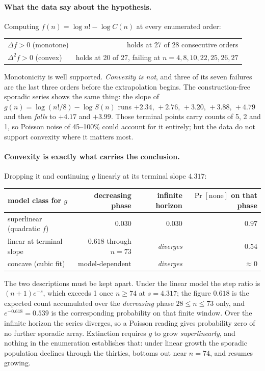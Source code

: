 \documentclass[11pt,a4paper]{article}
\theoremstyle{definition}
\begin{document}
\paragraph{What the data say about the hypothesis.} Computing
$f(n)=\log n!-\log C(n)$ at every enumerated order:

\begin{center}
\begin{tabular}{@{}lr@{}}
\toprule
$\Delta f>0$ (monotone) & holds at 27 of 28 consecutive orders \\
$\Delta^2 f>0$ (convex) & holds at 20 of 27, failing at $n=4,8,10,22,25,26,27$ \\
\bottomrule
\end{tabular}
\end{center}

Monotonicity is well supported. \emph{Convexity is not}, and three of its seven
failures are the last three orders before the extrapolation begins. The
construction-free sporadic series shows the same thing: the slope of
$g(n)=\log(n!/8)-\log S(n)$ runs $+2.34,\,+2.76,\,+3.20,\,+3.88,\,+4.79$ and then
\emph{falls} to $+4.17$ and $+3.99$. Those terminal points carry counts of 5, 2
and 1, so Poisson noise of 45--100\% could account for it entirely; but the data
do not support convexity where it matters most.

\paragraph{Convexity is exactly what carries the conclusion.} Dropping it and
continuing $g$ linearly at its terminal slope $4.317$:

\begin{center}
\begin{tabular}{@{}lrrr@{}}
\toprule
model class for $g$ & decreasing phase & infinite horizon & $\Pr[\text{none}]$ on that phase \\
\midrule
superlinear (quadratic $f$) & $0.030$ & $0.030$ & $0.97$ \\
linear at terminal slope & $0.618$ through $n=73$ & \emph{diverges} & $0.54$ \\
concave (cubic fit) & model-dependent & \emph{diverges} & $\approx0$ \\
\bottomrule
\end{tabular}
\end{center}

\noindent The two descriptions must be kept apart. Under the linear model the
step ratio is $(n+1)e^{-s}$, which exceeds 1 once $n\ge74$ at $s=4.317$; the
figure $0.618$ is the expected count accumulated over the \emph{decreasing} phase
$28\le n\le73$ only, and $e^{-0.618}=0.539$ is the corresponding probability on
that finite window. Over the infinite horizon the series diverges, so a Poisson
reading gives probability zero of no further sporadic array. Extinction requires
$g$ to grow \emph{superlinearly}, and nothing in the enumeration establishes that:
under linear growth the sporadic population declines through
the thirties, bottoms out near $n=74$, and resumes growing.
\end{document}
